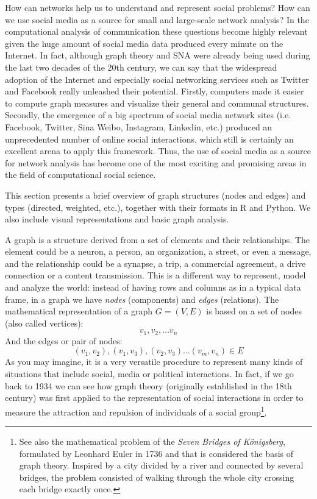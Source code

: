 How can networks help us to understand and represent social problems? How can we use social media as a source for small and large-scale network analysis? In the computational analysis of communication these questions become highly relevant given the huge amount of social media data produced every minute on the Internet.  In fact, although graph theory and SNA were already being used during the last two decades of the 20th century, we can say that the widespread adoption of the Internet and especially social networking services such as Twitter and Facebook really unleashed their potential. Firstly, computers made it easier to compute graph measures and visualize their general and communal structures. Secondly, the emergence of a big spectrum of social media network sites (i.e. Facebook, Twitter, Sina Weibo, Instagram, Linkedin, etc.) produced an unprecedented number of online social interactions, which still is certainly an excellent arena to apply this framework. Thus, the use of social media as a source for network analysis has become one of the most exciting and promising areas in the field of computational social science.

This section presents a brief overview of graph structures (nodes and edges) and types (directed, weighted, etc.), together with their formats in R and Python. We also include visual representations and basic graph analysis.

A graph is a structure derived from a set of elements and their relationships. The element could be a neuron, a person, an organization, a street, or even a message, and the relationship could be a synapse, a trip, a commercial agreement, a drive connection or a content transmission. This is a different way to represent, model and analyze the world: instead of having rows and columns as in a typical data frame, in a graph we have \textit{nodes} (components) and \textit{edges} (relations). The mathematical representation of a graph $G=(V,E)$ is based on a set of nodes (also called vertices): \[{v_{1}, v_{2},… v_{n}}\] And the edges or pair of nodes: \[{(v_{1}, v_{2}), (v_{1}, v_{3}), (v_{2},v_{3}) … (v_{m}, v_{n}) \in E}\] As you may imagine, it is a very versatile procedure to represent many kinds of situations that include social, media or political interactions. In fact, if we go back to 1934 we can see how graph theory (originally established in the 18th century) was first applied to the representation of social interactions \citep{moreno1934shall} in order to measure the attraction and repulsion of individuals of a social group\footnote{See also the mathematical problem of the \textit{Seven Bridges of K\"onigsberg}, formulated by Leonhard Euler in 1736 and that is considered the basis of graph theory. Inspired by a city divided by a river and connected by several bridges, the problem consisted of walking through the whole city crossing each bridge exactly once.}.

